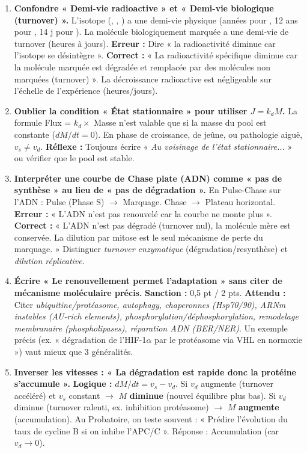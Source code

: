 \documentclass[11pt]{article}
\begin{document}
\begin{attention}
\begin{enumerate}
    \item \textbf{Confondre « Demi-vie radioactive » et « Demi-vie biologique (turnover) ».} 
    L'isotope (, , ) a une demi-vie physique (années pour , 12 ans pour , 14 j pour ). La molécule biologiquement marquée a une demi-vie de turnover (heures à jours). \textbf{Erreur :} Dire « la radioactivité diminue car l'isotope se désintègre ». \textbf{Correct :} « La radioactivité spécifique diminue car la molécule marquée est dégradée et remplacée par des molécules non marquées (turnover) ». La décroissance radioactive est négligeable sur l'échelle de l'expérience (heures/jours).
    \item \textbf{Oublier la condition « État stationnaire » pour utiliser $J = k_d M$.} 
    La formule Flux = $k_d \times$ Masse n'est valable que si la masse du pool est constante ($dM/dt = 0$). En phase de croissance, de jeûne, ou pathologie aiguë, $v_s \neq v_d$. \textbf{Réflexe :} Toujours écrire « \emph{Au voisinage de l'état stationnaire...} » ou vérifier que le pool est stable.
    \item \textbf{Interpréter une courbe de Chase plate (ADN) comme « pas de synthèse » au lieu de « pas de dégradation ».} 
    En Pulse-Chase sur l'ADN : Pulse (Phase S) $\rightarrow$ Marquage. Chase $\rightarrow$ Plateau horizontal. \textbf{Erreur :} « L'ADN n'est pas renouvelé car la courbe ne monte plus ». \textbf{Correct :} « L'ADN n'est pas dégradé (turnover nul), la molécule mère est conservée. La dilution par mitose est le seul mécanisme de perte du marquage. » Distinguer \emph{turnover enzymatique} (dégradation/resynthèse) et \emph{dilution réplicative}.
    \item \textbf{Écrire « Le renouvellement permet l'adaptation » sans citer de mécanisme moléculaire précis.} 
    \textbf{Sanction :} 0,5 pt / 2 pts. \textbf{Attendu :} Citer \emph{ubiquitine/protéasome, autophagy, chaperonnes (Hsp70/90), ARNm instables (AU-rich elements), phosphorylation/déphosphorylation, remodelage membranaire (phospholipases), réparation ADN (BER/NER)}. Un exemple précis (ex. « dégradation de l'HIF-1$\alpha$ par le protéasome via VHL en normoxie ») vaut mieux que 3 généralités.
    \item \textbf{Inverser les vitesses : « La dégradation est rapide donc la protéine s'accumule ».} 
    \textbf{Logique :} $dM/dt = v_s - v_d$. Si $v_d$ augmente (turnover accéléré) et $v_s$ constant $\rightarrow$ $M$ \textbf{diminue} (nouvel équilibre plus bas). Si $v_d$ diminue (turnover ralenti, ex. inhibition protéasome) $\rightarrow$ $M$ \textbf{augmente} (accumulation). Au Probatoire, on teste souvent : « Prédire l'évolution du taux de cycline B si on inhibe l'APC/C ». Réponse : Accumulation (car $v_d \to 0$).
\end{enumerate}
\end{attention}
\end{document}
